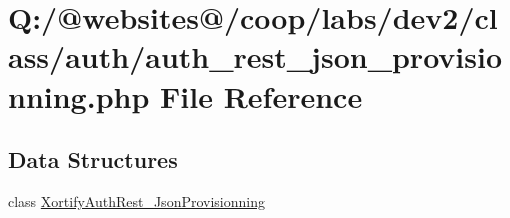 \hypertarget{auth__rest__json__provisionning_8php}{\section{Q\-:/@websites@/coop/labs/dev2/class/auth/auth\-\_\-rest\-\_\-json\-\_\-provisionning.php File Reference}
\label{auth__rest__json__provisionning_8php}
}
\subsection*{Data Structures}
\begin{DoxyCompactItemize}
\item 
class \hyperlink{class_xortify_auth_rest___json_provisionning}{Xortify\-Auth\-Rest\-\_\-\-Json\-Provisionning}
\end{DoxyCompactItemize}
